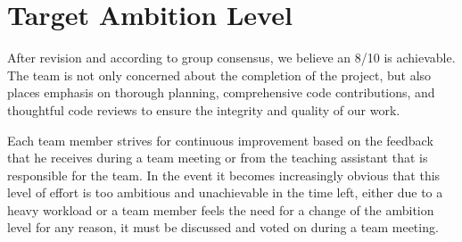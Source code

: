 \section{Target Ambition Level}
After revision and according to group consensus, we believe an 8/10 is achievable. The team is not only concerned about the completion of the project, but also places emphasis on thorough planning, comprehensive code contributions, and thoughtful code reviews to ensure the integrity and quality of our work. 
\par
Each team member strives for continuous improvement based on the feedback that he receives during a team meeting or from the teaching assistant that is responsible for the team. In the event it becomes increasingly obvious that this level of effort is too ambitious and unachievable in the time left, either due to a heavy workload or a team member feels the need for a change of the ambition level for any reason, it must be discussed and voted on during a team meeting.